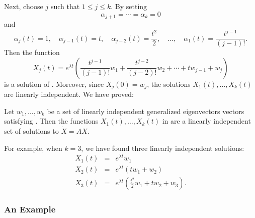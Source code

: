 \documentclass{ximera}
\begin{document}
Next, choose $j$ such that $1\le j\le k$.  By setting
\[ 
\alpha_{j+1} =  \cdots = \alpha_k = 0
\]
and 
\[
\alpha_j(t)=1, \quad \alpha_{j-1}(t)=t, \quad \alpha_{j-2}(t)=\frac{t^2}{2},
\quad \ldots, \quad\alpha_1(t)=\frac{t^{j-1}}{(j-1)!}.
\]
Then the function 
\begin{equation}  \label{E:Xj}
X_j(t)=e^{\lambda t} \left(\frac{t^{j-1}}{(j-1)!}w_1+\frac{t^{j-2}}{(j-2)!}w_2
+\cdots+tw_{j-1}+w_j\right)
\end{equation}
is a solution of .   Moreover, since $X_j(0)=w_j$, the 
solutions $X_1(t),\ldots,X_k(t)$ are linearly independent.  We have proved:
\begin{thm}  \label{T:JBsoln}
Let $w_1,\ldots,w_k$ be a set of linearly independent generalized
eigenvectors vectors satisfying . Then the functions 
$X_1(t),\ldots,X_k(t)$ in  are a linearly independent set of 
solutions to $\dot{X}=AX$.
\end{thm}

For example, when $k=3$, we have found three linearly independent solutions:
\begin{eqnarray*}
X_1(t)&=&e^{\lambda t} w_1\\
X_2(t)&=&e^{\lambda t} (tw_1+w_2)\\
X_3(t)&=&e^{\lambda t} \left(\frac{t^2}{2}w_1+tw_2+w_3\right).
\end{eqnarray*}


\subsubsection*{An Example}
\end{document}
